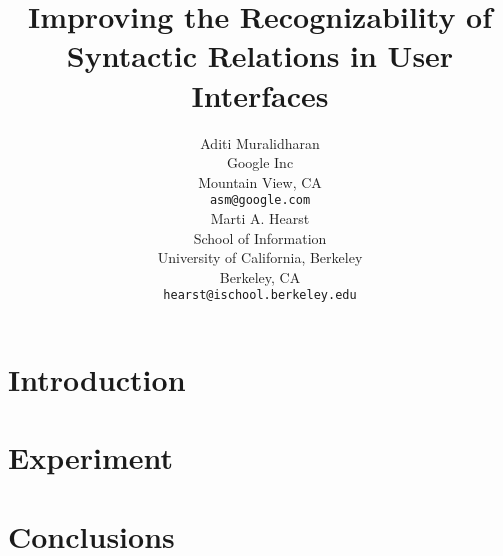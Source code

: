 \documentclass[11pt]{article}
\title{Improving the Recognizability of Syntactic Relations in User Interfaces}
\author{Aditi Muralidharan \\
  Google Inc \\
  Mountain View, CA\\
  {\tt asm@google.com} \\\And
  Marti A. Hearst \\
  School of Information\\
  University of California, Berkeley \\
  Berkeley, CA \\
  {\tt hearst@ischool.berkeley.edu} \\}
\begin{document}
\maketitle

\begin{abstract}

\end{abstract}



\section{Introduction}


\section{Experiment}


\section{Conclusions}




\end{document}
